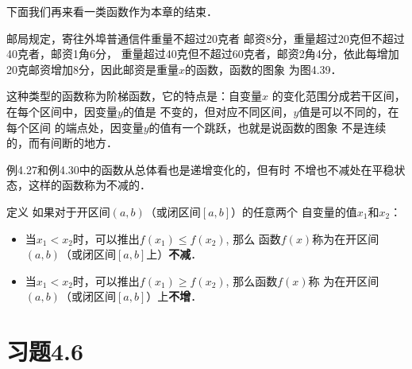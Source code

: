 下面我们再来看一类函数作为本章的结束．

\begin{example}
邮局规定，寄往外埠普通信件重量不超过20克者
邮资8分，重量超过20克但不超过40克者，邮资1角6分，
重量超过40克但不超过60克者，邮资2角4分，依此每增加
20克邮资增加8分，因此邮资是重量$x$的函数，函数的图象
为图4.39．
\begin{figure}[htp]
    \centering
{}
    \caption{}
\end{figure}

这种类型的函数称为阶梯函数，它的特点是：自变量$x$
的变化范围分成若干区间，在每个区间中，因变量$y$的值是
不变的，但对应不同区间，$y$值是可以不同的，在每个区间
的端点处，因变量$y$的值有一个跳跃，也就是说函数的图象
不是连续的，而有间断的地方．

例4.27和例4.30中的函数从总体看也是递增变化的，但有时
不增也不减处在平稳状态，这样的函数称为不减的．

    
\end{example}

\begin{blk}{定义}
    如果对于开区间$(a,b)$（或闭区间$[a,b]$）的任意两个
  自变量的值$x_1$和$x_2$：
  \begin{itemize}
      \item 当$x_1<x_2$时，可以推出$f(x_1)\le f(x_2)$, 那么
  函数$f(x)$称为在开区间$(a,b)$（或闭区间$[a,b]$上）\textbf{不减}．
\item  当$x_1<x_2$时，可以推出$f(x_1)\ge f(x_2)$, 那么函数$f(x)$称
  为在开区间$(a,b)$（或闭区间$[a,b]$）上\textbf{不增}．   
  \end{itemize}
  \end{blk}
  
  
  



\section*{习题4.6}

